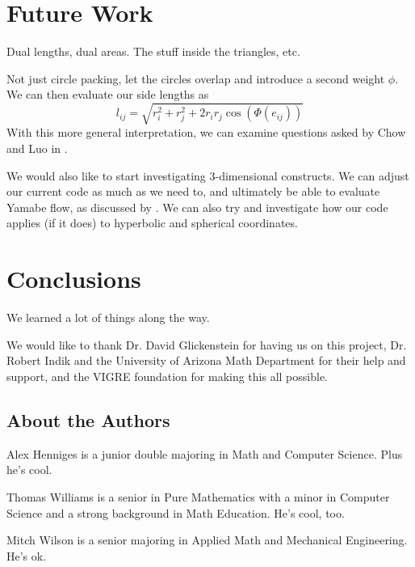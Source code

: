 \documentclass[12pt]{article}
\begin{document}
  \newpage
  \section{Future Work}
  
  \maketitle
  \cite{DrG}
  \cite{chowluo}
  
  Dual lengths, dual areas. The stuff inside the triangles, etc. 
  
  Not just circle packing, let the circles overlap and introduce a second weight $\phi$. We can then evaluate our side lengths as $$l_{ij} = \sqrt{r_i^2 + r_j^2 + 2r_ir_j\cos(\Phi(e_{ij}))}$$ With this more general interpretation, we can examine questions asked by Chow and Luo in \cite{chowluo}.  
  
  We would also like to start investigating 3-dimensional constructs. We can adjust our current code as much as we need to, and ultimately be able to evaluate Yamabe flow, as discussed by \cite{DrG}. We can also try and investigate how our code applies (if it does) to hyperbolic and spherical coordinates.  
  
  \newpage
  \section{Conclusions}
  
  We learned a lot of things along the way.\newline
  
  \noindent We would like to thank Dr. David Glickenstein for having us on this project, Dr. Robert Indik and the University of Arizona Math Department for their help and support, and the VIGRE foundation for making this all possible. 
  \maketitle
   
  \newpage
    
  
  
  \newpage
  \subsection*{About the Authors}
  \maketitle
  
  Alex Henniges is a junior double majoring in Math and Computer Science. Plus he's cool. 
  
  \noindent Thomas Williams is a senior in Pure Mathematics with a minor in Computer Science and a strong background in Math Education. He's cool, too. 
  
  \noindent Mitch Wilson is a senior majoring in Applied Math and Mechanical Engineering. He's ok. 
\end{document}
